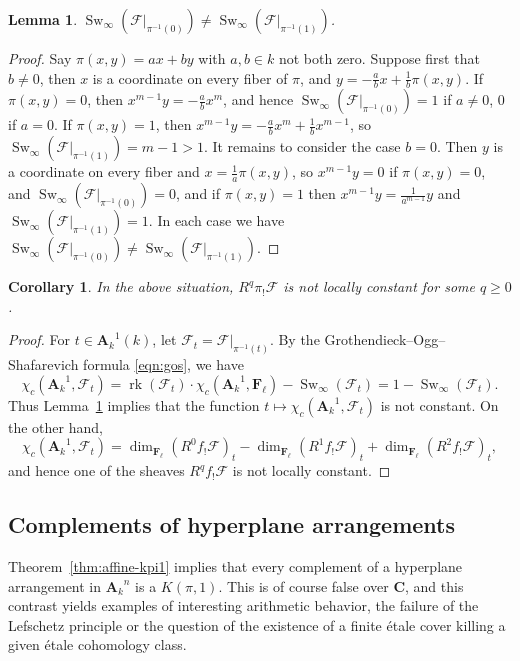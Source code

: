 \documentclass[twoside]{amsart}
\renewcommand{\AA}{\mathbf{A}}
\newcommand{\CC}{\mathbf{C}}
\newcommand{\FF}{\mathbf{F}}
\newcommand{\Ff}{\mathscr{F}}
\DeclareMathOperator{\Swan}{Sw}
\DeclareMathOperator{\rk}{rk}
\newcommand{\ANK}[2]{{\AA_{#2}}^{\! \! \! \!  #1}} %
\newcommand{\AN}[1]{\ANK{#1}{k}}
\theoremstyle{plain}
\newtheorem{lemma}[subsubsection]{Lemma}
\newtheorem{corollary}[subsubsection]{Corollary}
\theoremstyle{definition}
\theoremstyle{remark}
\numberwithin{equation}{subsection}
\begin{document}
\begin{lemma} \label{lemma:fierce-is-bad}
	$\Swan_\infty(\Ff|_{\pi^{-1}(0)})\neq \Swan_\infty(\Ff|_{\pi^{-1}(1)})$.
\end{lemma}

\begin{proof}
Say $\pi(x, y) = ax + by$ with $a, b\in k$ not both zero. Suppose first that $b\neq 0$, then $x$ is a coordinate on every fiber of $\pi$, and $y= -\frac{a}{b}x + \frac{1}{b}\pi(x, y)$. If $\pi(x, y) = 0$, then $x^{m-1}y = -\frac{a}{b}x^m$, and hence $\Swan_\infty(\Ff|_{\pi^{-1}(0)}) = 1$ if $a\neq 0$, $0$ if $a=0$. If $\pi(x, y) = 1$, then $x^{m-1}y = -\frac{a}{b}x^m + \frac{1}{b} x^{m-1}$, so  $\Swan_\infty(\Ff|_{\pi^{-1}(1)}) = m-1>1$. It remains to consider the case $b=0$. Then $y$ is a coordinate on every fiber and $x = \frac{1}{a} \pi(x, y)$, so $x^{m-1}y = 0$ if $\pi(x, y) = 0$, and $\Swan_\infty(\Ff|_{\pi^{-1}(0)}) = 0$, and if $\pi(x, y) = 1$ then $x^{m-1} y = \frac{1}{a^{m-1}} y$ and $\Swan_\infty(\Ff|_{\pi^{-1}(1)}) = 1$. In each case we have $\Swan_\infty(\Ff|_{\pi^{-1}(0)}) \neq \Swan_\infty(\Ff|_{\pi^{-1}(1)})$. 
\end{proof}

\begin{corollary}
	In the above situation, $R^q \pi_! \Ff$ is not locally constant for some $q\geq 0$.
\end{corollary}

\begin{proof}
For $t\in \AN 1(k)$, let $\Ff_t = \Ff|_{\pi^{-1}(t)}$. By the Grothendieck--Ogg--Shafarevich formula \eqref{eqn:gos}, we have 
\[ 
	\chi_c(\AN 1, \Ff_t) = \rk(\Ff_t)\cdot \chi_c(\AN 1, \FF_\ell) - \Swan_\infty(\Ff_t) = 1 - \Swan_\infty(\Ff_t).
\]
Thus Lemma~\ref{lemma:fierce-is-bad} implies that the function  $t\mapsto \chi_c(\AN 1, \Ff_t)$ is not constant. On the other hand, 
\[ 
	\chi_c(\AN 1, \Ff_t) = \dim_{\FF_\ell} (R^0 f_! \Ff)_t - \dim_{\FF_\ell} (R^1 f_! \Ff)_t + \dim_{\FF_\ell} (R^2 f_! \Ff)_t, 
\]  
and hence one of the sheaves $R^q f_! \Ff$ is not locally constant.
\end{proof}

\subsection{Complements of hyperplane arrangements}
\label{ex:hyperplane}

Theorem~\ref{thm:affine-kpi1} implies that  every complement of a hyperplane arrangement in $\AN{n}$ is a $K(\pi, 1)$. This is of course false over $\CC$, and this contrast yields examples of interesting arithmetic behavior, the failure of the Lefschetz principle or the question of the existence of a finite \'etale cover killing a given \'etale cohomology class.
\end{document}
